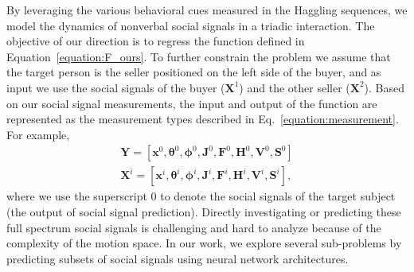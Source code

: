 By leveraging the various behavioral cues measured in the Haggling sequences, we model the dynamics of nonverbal social signals in a triadic interaction. The objective of our direction is to regress the function defined in Equation~\ref{equation:F_ours}. To further constrain the problem we assume that the target person is the seller positioned on the left side of the buyer, and as input we use the social signals of the buyer ($\mathbf{X}^1$) and the other seller ($\mathbf{X}^2$). Based on our social signal measurements, the input and output of the function are represented as the measurement types described in Eq.~\ref{equation:measurement}. For example,
\begin{equation}
\begin{gathered}
\mathbf{Y} = [ \mathbf{x}^0, \boldsymbol{\theta}^0, \boldsymbol{\phi}^0, \mathbf{J}^0, \mathbf{F}^0, \mathbf{H}^0, \mathbf{V}^0, \mathbf{S}^0 ]\\
\mathbf{X}^i = [ \mathbf{x}^i, \boldsymbol{\theta}^i, \boldsymbol{\phi}^i, \mathbf{J}^i, \mathbf{F}^i, \mathbf{H}^i, \mathbf{V}^i, \mathbf{S}^i ],
\end{gathered}
\end{equation}
where we use the superscript 0 to denote the social signals of the target subject (the output of social signal prediction). Directly investigating or predicting these full spectrum social signals is challenging and hard to analyze because of the complexity of the motion space. In our work, we explore several sub-problems by predicting subsets of social signals using neural network architectures.  


